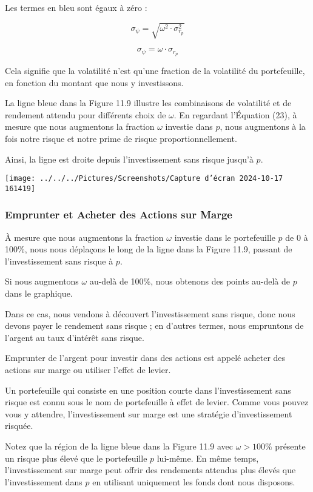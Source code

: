 \documentclass[a4paper, 12pt]{report}
\begin{document}
Les termes en bleu sont égaux à zéro :

\[
\sigma_\psi = \sqrt{\omega^2 \cdot \sigma^2_{r_p}} 
\]

\[
\sigma_\psi = \omega \cdot \sigma_{r_p} 
\]

Cela signifie que la volatilité n'est qu'une fraction de la volatilité du portefeuille, en fonction du montant que nous y investissons.

La ligne bleue dans la Figure 11.9 illustre les combinaisons de volatilité et de rendement attendu pour différents choix de \( \omega \). En regardant l'Équation (23), à mesure que nous augmentons la fraction \( \omega \) investie dans \( p \), nous augmentons à la fois notre risque et notre prime de risque proportionnellement.

Ainsi, la ligne est droite depuis l'investissement sans risque jusqu'à \( p \).

\begin{center}
	\texttt{[image: ../../../Pictures/Screenshots/Capture d'écran 2024-10-17 161419]}
\end{center}

\subsubsection{Emprunter et Acheter des Actions sur Marge}


À mesure que nous augmentons la fraction \( \omega \) investie dans le portefeuille \( p \) de 0 à 100\%, nous nous déplaçons le long de la ligne dans la Figure 11.9, passant de l'investissement sans risque à \( p \).

Si nous augmentons \( \omega \) au-delà de 100\%, nous obtenons des points au-delà de \( p \) dans le graphique.

Dans ce cas, nous vendons à découvert l'investissement sans risque, donc nous devons payer le rendement sans risque ; en d'autres termes, nous empruntons de l'argent au taux d'intérêt sans risque.

Emprunter de l'argent pour investir dans des actions est appelé acheter des actions sur marge ou utiliser l'effet de levier.

Un portefeuille qui consiste en une position courte dans l'investissement sans risque est connu sous le nom de portefeuille à effet de levier. Comme vous pouvez vous y attendre, l'investissement sur marge est une stratégie d'investissement risquée.

Notez que la région de la ligne bleue dans la Figure 11.9 avec \( \omega > 100\% \) présente un risque plus élevé que le portefeuille \( p \) lui-même. En même temps, l'investissement sur marge peut offrir des rendements attendus plus élevés que l'investissement dans \( p \) en utilisant uniquement les fonds dont nous disposons.
\end{document}
